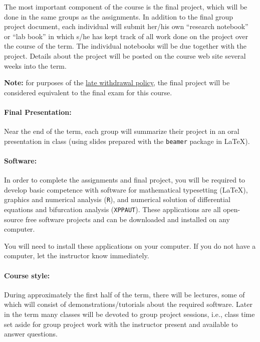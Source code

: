 \documentclass[12pt]{article}
\begin{document}
The most important component of the course is the final project, which
will be done in the same groups as the assignments.  In addition to
the final group project document, each individual will submit her/his
own ``research notebook'' or ``lab book'' in which s/he has kept track
of all work done on the project over the course of the term.  The
individual notebooks will be due together with the project.  Details
about the project will be posted on the course web site several weeks
into the term.

\textbf{Note:} for purposes of the \href{https://academiccalendars.romcmaster.ca/content.php?catoid=38&navoid=8043#late_withdrawal}{late withdrawal policy}, the final project will be considered equivalent to the final exam for this course.

\paragraph*{Final Presentation:}
Near the end of the term, each group will summarize their project in an oral presentation in class (using slides prepared with the {\tt beamer} package in \LaTeX).

\paragraph*{Software:} In order to complete the assignments and final project, you will be required to develop basic competence with software for mathematical typesetting (\LaTeX), graphics and numerical analysis ({\tt R}), and numerical solution of differential equations and bifurcation analysis ({\tt XPPAUT}).  These applications are all open-source free software projects and can be downloaded and installed on any computer.

\noindent You will need to install these applications on your computer.  If you do not have a computer, let the instructor know immediately.

\paragraph*{Course style:}

During approximately the first half of the term, there will be lectures, some of which will consist of demonstrations/tutorials about the required software.  Later in the term many classes will be devoted to group project sessions, i.e., class time set aside for group project work with the instructor present and available to answer questions.
\end{document}
